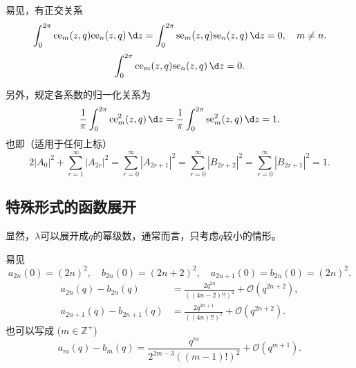 易见，有正交关系
\begin{equation*}
	\int_{0}^{2\pi} \mathrm{ce}_m(z, q) \mathrm{ce}_n(z, q) \,\d z = \int_{0}^{2\pi} \mathrm{se}_m(z, q) \mathrm{se}_n(z, q) \,\d z = 0, \quad m \neq n.
\end{equation*}
\begin{equation*}
	\int_{0}^{2\pi} \mathrm{ce}_m(z, q) \mathrm{se}_n(z, q) \,\d z = 0.
\end{equation*}

另外，规定各系数的归一化关系为
\begin{equation*}
	\frac{1}{\pi} \int_{0}^{2\pi} \mathrm{ce}_m^2(z, q) \,\d z = \frac{1}{\pi} \int_{0}^{2\pi} \mathrm{se}_m^2(z, q) \,\d z = 1.
\end{equation*}
也即（适用于任何上标）
\begin{equation*}
	2|A_0|^2 + \sum_{r=1}^{\infty} |A_{2r}|^2 = \sum_{r=0}^{\infty} |A_{2r+1}|^2 = \sum_{r=0}^{\infty} |B_{2r+2}|^2 = \sum_{r=0}^{\infty} |B_{2r+1}|^2 = 1.
\end{equation*}

\subsection{特殊形式的函数展开}
显然，\(\lambda\)可以展开成\(q\)的幂级数，通常而言，只考虑\(q\)较小的情形。

易见
\begin{equation*}
	a_{2n}(0) = (2n)^2, \quad b_{2n}(0) = (2n + 2)^2, \quad a_{2n+1}(0) = b_{2n}(0) = (2n)^2.
\end{equation*}
\begin{align*}
	a_{2n}(q) - b_{2n}(q)     & = \frac{2q^{2n}}{((4n - 2)!!)^2} + \mathcal{O}(q^{2n+2}), \\
	a_{2n+1}(q) - b_{2n+1}(q) & = \frac{2q^{2n+1}}{((4n)!!)^2} + \mathcal{O}(q^{2n+2}).
\end{align*}
也可以写成 (\(m \in \mathbb{Z}^+\))
\begin{equation*}
	a_m(q) - b_m(q) = \frac{q^m}{2^{2m-3}((m - 1)!)^2} + \mathcal{O}(q^{m+1}).
\end{equation*}

